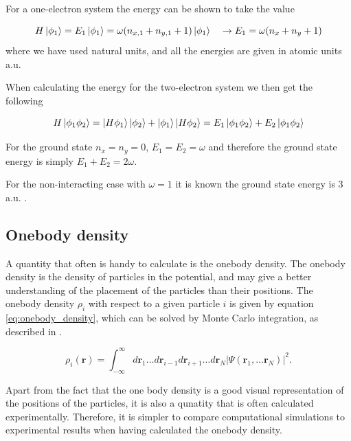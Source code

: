 \documentclass[norsk,a4paper,12pt]{article}
\begin{document}
For a one-electron system the energy can be shown to take the value 

\begin{equation}
	H \ket{\phi_1} = E_1 \ket{\phi_1} = \omega(n_{x,1} + n_{y,1} + 1) \ket{\phi_1} \quad  \rightarrow E_1 = \omega(n_x + n_y + 1)
\end{equation}
where we have used natural units, and all the energies are given in atomic units a.u.

When calculating the energy for the two-electron system we then get the following

\begin{equation}
	H \ket{\phi_1 \phi_2} = \ket{H \phi_1 } \ket{\phi_2} + \ket{\phi_1} \ket{H \phi_2} = E_1 \ket{\phi_1 \phi_2} + E_2 \ket{\phi_1 \phi_2} 
\end{equation}

For the ground state $n_x = n_y = 0$, $E_1 = E_2 = \omega$ and therefore the ground state energy is simply $E_1 + E_2 = 2\omega$. 

For the non-interacting case with $\omega=1$ it is known the ground state energy is 3 a.u. \cite{Taut}. 

\subsection{Onebody density} \label{sec:onebody}
A quantity that often is handy to calculate is the onebody density. The onebody density is the density of particles in the potential, and may give a better understanding of the placement of the particles than their positions. The onebody density $\rho_i$ with respect to a given particle $i$ is given by equation \ref{eq:onebody_density}, which can be solved by Monte Carlo integration, as described in \cite{Nordhagen}.    

\begin{equation}
\label{eq:onebody_density}
\rho_i(\boldsymbol{r})=\int_{-\infty}^{\infty}d\boldsymbol{r}_1\hdots d\boldsymbol{r}_{i-1}d\boldsymbol{r}_{i+1}\hdots d\boldsymbol{r}_N |\Psi(\boldsymbol{r}_1,\hdots \boldsymbol{r}_N)|^2.
\end{equation}

Apart from the fact that the one body density is a good visual representation of the positions of the particles, it is also a qunatity that is often calculated experimentally. Therefore, it is simpler to compare computational simulations to  experimental results when having calculated the onebody density.
\end{document}
